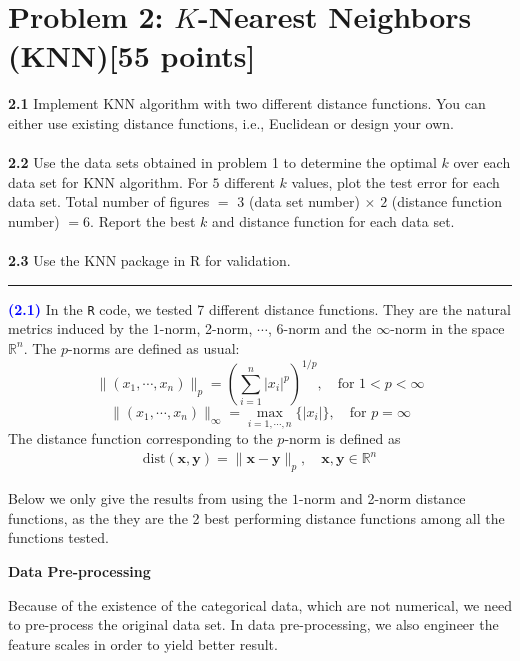 \documentclass{article}
\newcommand{\code}[1]{\texttt{#1}}
\newcommand{\qnum}[1]{\noindent\textcolor{blue}{\textbf{(#1)}}}
\newcommand{\tx}[1]{\text{#1}}
\newcommand{\sep}{\begin{center}\textcolor{gray}{\rule{\textwidth}{0.75pt}}\end{center}}
\begin{document}
\newpage
\section*{Problem 2: $K$-Nearest Neighbors (KNN)[55 points]} 

\textbf{2.1}  Implement KNN algorithm with two different distance functions. You can either use existing distance functions, i.e., Euclidean  or design your own.
\\
\\
\textbf{2.2}  Use the data sets obtained in problem 1 to determine the optimal $k$  over each data set for KNN algorithm. For  $5$ different $k$ values, plot the test error for each data set.  Total number of  figures $=$ 3 (data set number) $\times$ $2$ (distance function number) $=6$. Report the best $k$  and distance function for each data set. 
\\
\\
\textbf{2.3} Use the KNN package in R for validation.
\sep 

\qnum{2.1}
In the \code{R} code, we tested 7 different distance functions. They are the natural metrics induced by the $1$-norm, 2-norm, $\cdots$, 6-norm and the $\infty$-norm in the space $\mathbb{R}^n$. The $p$-norms are defined as usual:
\[
    \|(x_1,\cdots,x_n)\|_p 
    = \left(\sum_{i=1}^n|x_i|^p\right)^{1/p}, \quad 
    \text{for } 1<p<\infty
\]
\[
    \|(x_1,\cdots,x_n)\|_\infty 
    = \max_{i=1,\cdots,n}\{|x_i|\},\quad 
    \text{for } p = \infty
\]
The distance function corresponding to the $p$-norm is defined as 
\[
    \begin{aligned}
        \tx{dist}(\textbf{x}, \textbf{y})
        = \|\textbf{x} - \textbf{y}\|_p,\quad 
        \textbf{x}, \textbf{y} \in \mathbb{R}^n
    \end{aligned}
\]

Below we only give the results from using the $1$-norm and 2-norm distance functions, as the they are the 2 best performing distance functions among all the functions tested.
\bigskip

\noindent\textbf{Data Pre-processing}
\bigskip

Because of the existence of the categorical data, which are not numerical, we need to pre-process the original data set.
In data pre-processing, we also engineer the feature scales in order to yield better result.
\end{document}
